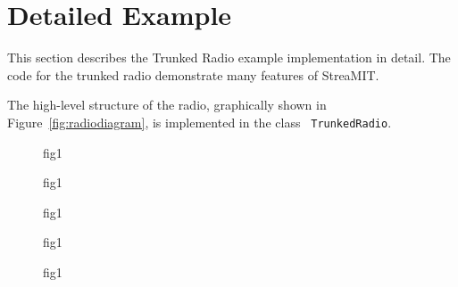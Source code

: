 \section{Detailed Example}
This section describes the Trunked Radio example implementation in
detail. The code for the trunked radio demonstrate many features of
StreaMIT. 

The high-level structure of the radio, graphically shown in
Figure~\ref{fig:radiodiagram}, is implemented in the class {\tt
TrunkedRadio}.


\begin{figure}
\centering
{}
\caption{ fig1}
\label{fig:data_structs}
\end{figure}

\begin{figure*}
\centering
{}
\caption{ fig1}
\label{fig:data_structs}
\end{figure*}

\begin{figure*}
\centering
{}
\caption{ fig1}
\label{fig:data_structs}
\end{figure*}

\begin{figure}
\centering
{}
\caption{ fig1}
\label{fig:data_structs}
\end{figure}

\begin{figure*}
\centering
{}
\caption{ fig1}
\label{fig:data_structs}
\end{figure*}


\newpage


